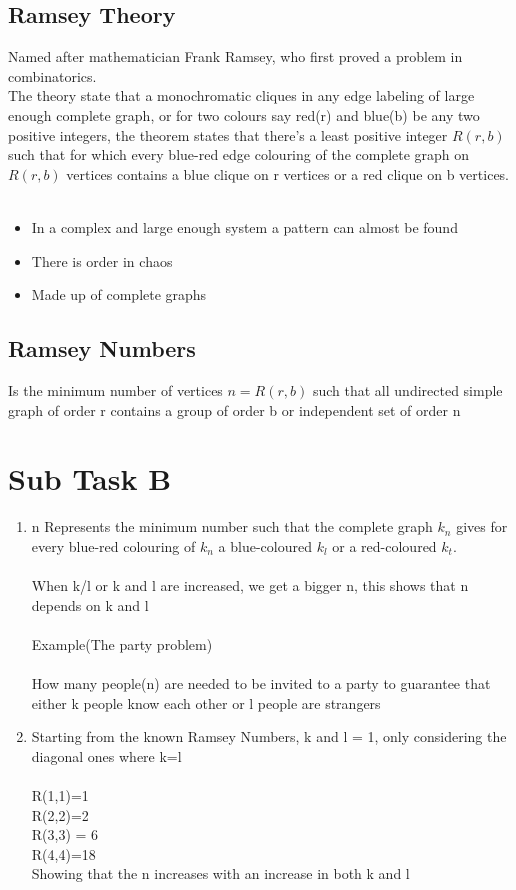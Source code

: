 \documentclass{Assignment}
\begin{document}
\subsection*{Ramsey Theory}
Named after mathematician Frank Ramsey, who first proved a problem in combinatorics.\\
The theory state that a monochromatic cliques in any edge labeling of large enough complete graph, or for two colours say red(r) and blue(b) be any two positive integers, the theorem states that there's a least positive integer $R(r,b)$ such that for which every blue-red edge colouring of the complete graph on $R(r,b)$ vertices contains a blue clique on r vertices or a red clique on b vertices.\\\\
\begin{itemize}
	\item In a complex and large enough system a pattern can almost be found
	\item There is order in chaos
	\item Made up of complete graphs
\end{itemize}
\subsection*{Ramsey Numbers}
Is the minimum number of vertices $n = R(r,b)$ such that all undirected simple graph of order r contains a group of order b or independent set of order n
\newpage
\section*{Sub Task B}
\begin{enumerate}
	\item n Represents the minimum number such that the complete graph $k_n$ gives for every blue-red colouring of $k_n$ a blue-coloured $k_l$ or a red-coloured $k_t$.\\\\
	When k/l or k and l are increased, we get a bigger n, this shows that n depends on k and l\\\\
	Example(The party problem)\\\\
	How many people(n) are needed to be invited to a party to guarantee that either k people know each other or l people are strangers 
	\item 
	Starting from the known Ramsey Numbers, k and l = 1, only considering the diagonal ones where k=l\\\\
	R(1,1)=1\\
	R(2,2)=2\\
	R(3,3) = 6\\
	R(4,4)=18\\
Showing that the n increases with an increase in both k and l
\end{enumerate}
\end{document}
